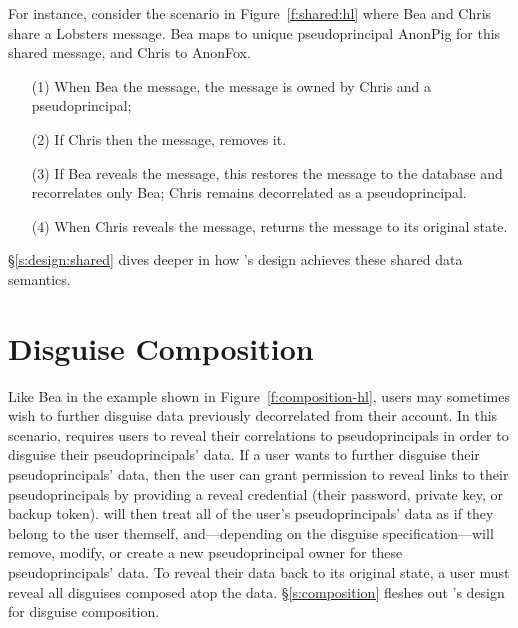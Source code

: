 %
For instance, consider the scenario in Figure~\ref{f:shared:hl} where Bea and
Chris share a Lobsters message. Bea maps to unique pseudoprincipal AnonPig for this
shared message, and Chris to AnonFox.
\begin{enumerate}[nosep]
    \item[(1)] When Bea \xxs the message, the message is owned by
Chris and a pseudoprincipal;
    \item[(2)] If Chris then \xxs the message, \sys removes it.
    \item[(3)] If Bea reveals the message, this restores the message to the database
and recorrelates only Bea; Chris remains decorrelated as a pseudoprincipal.
\item[(4)] When Chris reveals the message, \sys returns
the message to its original state.
\end{enumerate}
%

\S\ref{s:design:shared} dives deeper in how \sys's design achieves these shared
data semantics.


\section{Disguise Composition}
\label{s:semantics:hl:composition}

Like Bea in the example shown in Figure~\ref{f:composition-hl}, users may
sometimes wish to further disguise data previously decorrelated from their
account. In this scenario, \sys requires users to reveal their correlations to
pseudoprincipals in order to disguise their pseudoprincipals' data.
%
If a user wants to further disguise their pseudoprincipals' data, then the user
can grant \sys permission to reveal links to their pseudoprincipals by providing
a reveal credential (their password, private key, or backup token). 
%
\sys will then treat all of the user's pseudoprincipals' data as if they belong
to the user themself, and---depending on the disguise specification---will remove,
modify, or create a new pseudoprincipal owner for these pseudoprincipals' data.
%
To reveal their data back to its original state, a user must reveal all
disguises composed atop the data.
%
\S\ref{s:composition} fleshes out \sys's design for disguise composition.

